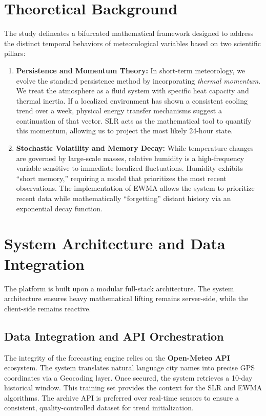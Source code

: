 \documentclass[14pt]{extarticle}
\begin{document}
\section{Theoretical Background}
The study delineates a bifurcated mathematical framework designed to address the distinct temporal behaviors of meteorological variables based on two scientific pillars:

\begin{enumerate}
    \item \textbf{Persistence and Momentum Theory:} In short-term meteorology, we evolve the standard persistence method by incorporating \textit{thermal momentum}. We treat the atmosphere as a fluid system with specific heat capacity and thermal inertia. If a localized environment has shown a consistent cooling trend over a week, physical energy transfer mechanisms suggest a continuation of that vector. SLR acts as the mathematical tool to quantify this momentum, allowing us to project the most likely 24-hour state.
    \item \textbf{Stochastic Volatility and Memory Decay:} While temperature changes are governed by large-scale masses, relative humidity is a high-frequency variable sensitive to immediate localized fluctuations. Humidity exhibits ``short memory,'' requiring a model that prioritizes the most recent observations. The implementation of EWMA allows the system to prioritize recent data while mathematically ``forgetting'' distant history via an exponential decay function.
\end{enumerate}

\section{System Architecture and Data Integration}
The platform is built upon a modular full-stack architecture. The system architecture ensures heavy mathematical lifting remains server-side, while the client-side remains reactive.

\subsection{Data Integration and API Orchestration}
The integrity of the forecasting engine relies on the \textbf{Open-Meteo API} ecosystem. The system translates natural language city names into precise GPS coordinates via a Geocoding layer. Once secured, the system retrieves a 10-day historical window. This training set provides the context for the SLR and EWMA algorithms. The archive API is preferred over real-time sensors to ensure a consistent, quality-controlled dataset for trend initialization.
\end{document}
